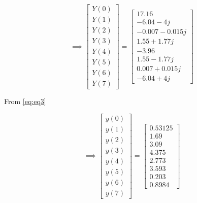 \documentclass[journal,12pt,twocolumn]{IEEEtran}
\renewcommand\thesection{\arabic{section}}
\begin{document}
\begin{enumerate}[label=\thesection.\arabic*.,ref=\thesection.\theenumi]
\begin{equation}
\implies
\begin{bmatrix}
Y(0) \\
Y(1) \\
Y(2) \\
Y(3) \\
Y(4) \\
Y(5) \\
Y(6) \\
Y(7)
\end{bmatrix}
=
\begin{bmatrix}
17.16 \\
-6.04 - 4j \\
-0.007-0.015j \\
1.55 +1.77j \\
-3.96 \\
1.55 -1.77j\\
0.007+0.015j  \\
-6.04 + 4j
\end{bmatrix}
\end{equation}

From \ref{eq:eq3}

\begin{equation}
\implies
\begin{bmatrix}
y(0) \\
y(1) \\
y(2) \\
y(3) \\
y(4) \\
y(5) \\
y(6) \\
y(7)
\end{bmatrix}
=
\begin{bmatrix}
0.53125 \\
1.69 \\
3.09 \\
4.375 \\
2.773\\
3.593\\
0.203\\
0.8984
\end{bmatrix}
\end{equation}

\end{enumerate}
\end{document}
